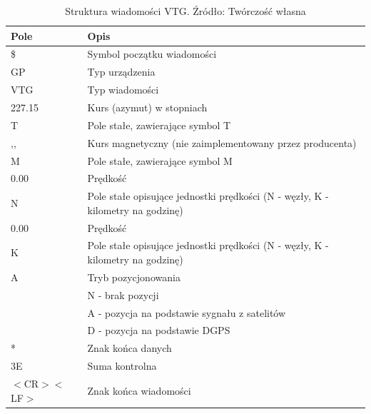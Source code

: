 \begin{table}[H]
\centering
\caption{Struktura wiadomości VTG. Źródło: Twórczość własna}
\label{table:table_nmea_vtg_message}
\begin{tabular}{| l | l |}
\hline
\textbf{Pole} & \textbf{Opis} \\ \hline
\$ & Symbol początku wiadomości  \\ \hline
GP & Typ urządzenia  \\ \hline
VTG & Typ wiadomości  \\ \hline
227.15 & Kurs (azymut) w stopniach \\ \hline
T & Pole stałe, zawierające symbol T \\ \hline
,, & Kurs magnetyczny (nie zaimplementowany przez producenta) \\ \hline
M & Pole stałe, zawierające symbol M \\ \hline
0.00 & Prędkość \\ \hline
N & Pole stałe opisujące jednostki prędkości (N - węzły, K - kilometry na godzinę) \\ \hline
0.00 & Prędkość \\ \hline
K & Pole stałe opisujące jednostki prędkości (N - węzły, K - kilometry na godzinę) \\ \hline
A & Tryb pozycjonowania \\
  & N - brak pozycji \\
  & A - pozycja na podstawie sygnału z satelitów \\
  & D - pozycja na podstawie DGPS \\ \hline
* & Znak końca danych \\ \hline
3E & Suma kontrolna \\ \hline
$<$CR$><$LF$>$ & Znak końca wiadomości \\ \hline
\end{tabular}
\end{table}

